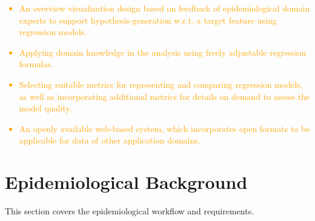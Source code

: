 \documentclass[journal]{style/vgtc} 			          %
\newcommand{\design}[1]{\textcolor{orange}{#1}}
\begin{document}
\design{
\begin{itemize}
  \item An overview visualization design based on feedback of epidemiological domain experts to support hypothesis-generation w.r.t. a target feature using regression models.
  \item Applying domain knowledge in the analysis using freely adjustable regression formulas.
  \item Selecting suitable metrics for representing and comparing regression models, as well as incorporating additional metrics for details on demand to assess the model quality.
  \item An openly available web-based system, which incorporates open formats to be applicable for data of other application domains.
\end{itemize}
}
\section{Epidemiological Background} \label{sec:Background}
This section covers the epidemiological workflow and requirements.
\end{document}
